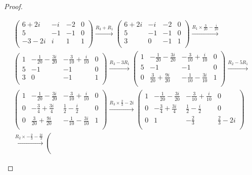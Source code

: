 \begin{proof}
\begin{parts}
			\begin{gather*}
			\left(
\begin{array}{ccc|c}
 6+2 i & -i & -2 & 0 \\
 5 & -1 & -1 & 0 \\
 -3-2 i & i & 1 & 1 \\
\end{array}
\right) \xrightarrow{R_3+R_1} \left(
\begin{array}{ccc|c}
 6+2 i & -i & -2 & 0 \\
 5 & -1 & -1 & 0 \\
 3 & 0 & -1 & 1 \\
\end{array}
\right) \xrightarrow{R_1\times \frac{3}{20}-\frac{i}{20}} \\\left(
\begin{array}{ccc|c}
 1 & -\frac{1}{20}-\frac{3 i}{20} & -\frac{3}{10}+\frac{i}{10} & 0 \\
 5 & -1 & -1 & 0 \\
 3 & 0 & -1 & 1 \\
\end{array}
\right) \xrightarrow{R_3-3R_1} \left(
\begin{array}{ccc|c}
 1 & -\frac{1}{20}-\frac{3 i}{20} & -\frac{3}{10}+\frac{i}{10} & 0 \\
 5 & -1 & -1 & 0 \\
 0 & \frac{3}{20}+\frac{9 i}{20} & -\frac{1}{10}-\frac{3 i}{10} & 1 \\
\end{array}
\right) \xrightarrow{R_2-5R_1}\\ \left(
\begin{array}{ccc|c}
 1 & -\frac{1}{20}-\frac{3 i}{20} & -\frac{3}{10}+\frac{i}{10} & 0 \\
 0 & -\frac{3}{4}+\frac{3 i}{4} & \frac{1}{2}-\frac{i}{2} & 0 \\
 0 & \frac{3}{20}+\frac{9 i}{20} & -\frac{1}{10}-\frac{3 i}{10} & 1 \\
\end{array}
\right) \xrightarrow{R_3\times \frac{2}{3}-2 i} \left(
\begin{array}{ccc|c}
 1 & -\frac{1}{20}-\frac{3 i}{20} & -\frac{3}{10}+\frac{i}{10} & 0 \\
 0 & -\frac{3}{4}+\frac{3 i}{4} & \frac{1}{2}-\frac{i}{2} & 0 \\
 0 & 1 & -\frac{2}{3} & \frac{2}{3}-2 i \\
\end{array}
\right) \\\xrightarrow{R_2\times -\frac{2}{3}-\frac{2 i}{3}} \left(

\end{gather*}
\end{parts}
\end{proof}
